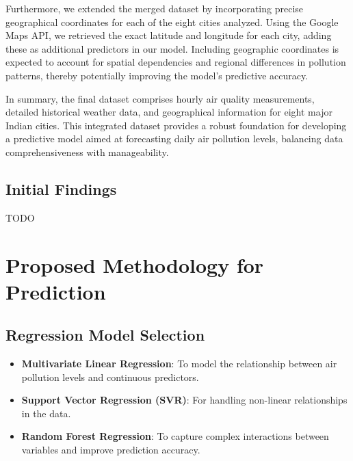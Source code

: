 \documentclass[12pt]{article}
\begin{document}
Furthermore, we extended the merged dataset by incorporating precise geographical coordinates for each of the eight cities analyzed. Using the Google Maps API, we retrieved the exact latitude and longitude for each city, adding these as additional predictors in our model. Including geographic coordinates is expected to account for spatial dependencies and regional differences in pollution patterns, thereby potentially improving the model's predictive accuracy.

In summary, the final dataset comprises hourly air quality measurements, detailed historical weather data, and geographical information for eight major Indian cities. This integrated dataset provides a robust foundation for developing a predictive model aimed at forecasting daily air pollution levels, balancing data comprehensiveness with manageability.

\subsection{Initial Findings}

TODO




\section{Proposed Methodology for Prediction}

\subsection{Regression Model Selection}

\begin{itemize}
    \item \textbf{Multivariate Linear Regression}: To model the relationship between air pollution levels and continuous predictors.
    \item \textbf{Support Vector Regression (SVR)}: For handling non-linear relationships in the data.
    \item \textbf{Random Forest Regression}: To capture complex interactions between variables and improve prediction accuracy.
\end{itemize}
\end{document}
